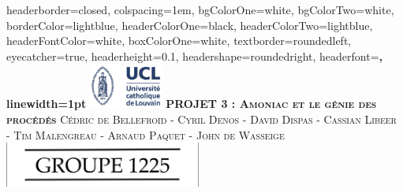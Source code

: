 \documentclass[landscape,a0paper,fontscale=0.285]{baposter} %
\begin{document}
\begin{poster}
{
headerborder=closed, %
colspacing=1em, %
bgColorOne=white, %
bgColorTwo=white, %
borderColor=lightblue, %
headerColorOne=black, %
headerColorTwo=lightblue, %
headerFontColor=white, %
boxColorOne=white, %
textborder=roundedleft, %
eyecatcher=true, %
headerheight=0.1\textheight, %
headershape=roundedright, %
headerfont=\Large\bf\textsc, %
linewidth=1pt %
}
%
{\includegraphics[height=4em]{UCL.jpg}} 
{\bf\textsc{PROJET 3 : Amoniac et le g\'enie des proc\'ed\'es}\vspace{0.5em}} 
{\textsc{\small Cédric de Bellefroid - Cyril Denos - David Dispas  - Cassian Libeer  - Tim Malengreau - Arnaud Paquet - John de Wasseige}} 
{\includegraphics[height=4em]{groupe.png}} 



\end{poster}
\end{document}
